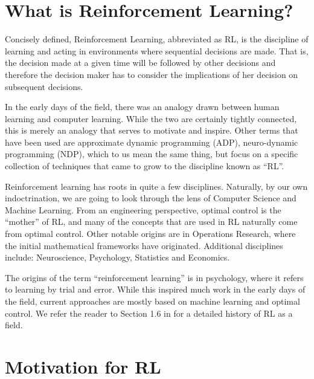 \section{What is Reinforcement Learning?}

Concisely defined, Reinforcement Learning, abbreviated as RL, is the discipline of learning and acting in 
environments where sequential decisions are made. That is, the decision made at a given time 
will be followed by other decisions and therefore the decision maker has to consider the implications 
of her decision on subsequent decisions. 



In the early days of the field, there was an analogy drawn between human learning and computer 
learning. While the two are certainly tightly connected, this is merely an analogy that serves to motivate and inspire. Other terms that 
have been used are approximate dynamic programming (ADP), neuro-dynamic programming (NDP), which to us
mean the same thing, but focus on a specific collection of techniques that came to grow to the discipline known as ``RL''.

 \medskip
{}
%
Reinforcement learning has roots in quite a few disciplines.
Naturally, by our own indoctrination, we are going to look through the lens of Computer Science
and Machine Learning. From an engineering perspective, optimal control is 
the ``mother'' of RL, and many of the concepts that are used in RL naturally come from optimal control. 
Other notable origins are in Operations Research, where the initial mathematical frameworks have originated.
Additional disciplines include: Neuroscience, Psychology, Statistics and
Economics.

The origins of the term ``reinforcement learning'' is in psychology, where it refers to learning by trial and error. 
While this inspired much work in the early days of the field, current approaches are mostly based on
machine learning and optimal control. We refer the reader to Section 1.6 in \cite{SuttonB98} for 
a detailed history of RL as a field. 

\section{Motivation for RL}


